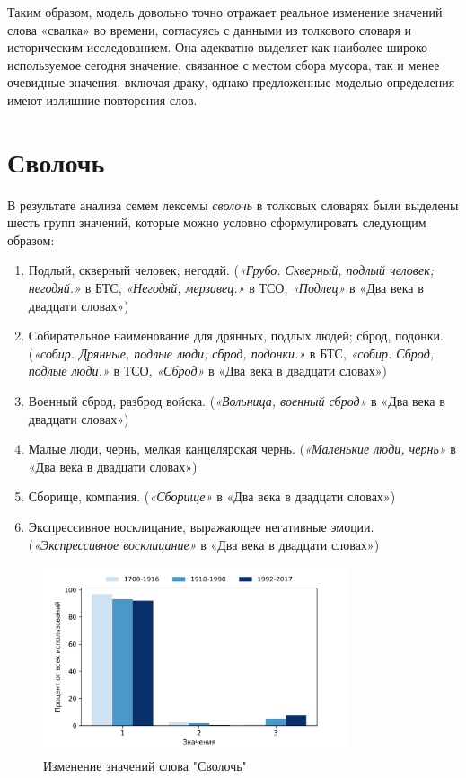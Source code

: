 Таким образом, модель довольно точно отражает реальное изменение значений слова «свалка»
во времени, согласуясь с данными из толкового словаря и историческим исследованием.
Она адекватно выделяет как наиболее широко используемое сегодня значение,
связанное с местом сбора мусора,
так и менее очевидные значения, включая драку,
однако предложенные моделью определения имеют излишние повторения слов.

\section*{Сволочь}

В результате анализа семем лексемы \textit{сволочь} в толковых словарях были выделены шесть групп значений,
которые можно условно сформулировать следующим образом:

\begin{enumerate}
    \item Подлый, скверный человек; негодяй.
(\textit{«Грубо. Скверный, подлый человек; негодяй.»} в БТС,
\textit{«Негодяй, мерзавец.»} в ТСО,
\textit{«Подлец»} в «Два века в двадцати словах»)
    \item Собирательное наименование для дрянных, подлых людей; сброд, подонки.
(\textit{«собир. Дрянные, подлые люди; сброд, подонки.»} в БТС,
\textit{«собир. Сброд, подлые люди.»} в ТСО,
\textit{«Сброд»} в «Два века в двадцати словах»)
    \item Военный сброд, разброд войска.
(\textit{«Вольница, военный сброд»} в «Два века в двадцати словах»)
    \item Малые люди, чернь, мелкая канцелярская чернь.
(\textit{«Маленькие люди, чернь»} в «Два века в двадцати словах»)
    \item Сборище, компания.
(\textit{«Сборище»} в «Два века в двадцати словах»)
    \item Экспрессивное восклицание, выражающее негативные эмоции.
(\textit{«Экспрессивное восклицание»} в «Два века в двадцати словах»)
\end{enumerate}

\begin{figure}[H]
	\centering
	\includegraphics[width=0.8\textwidth]{img/visualizations/svoloch'_minimal}
	\caption{Изменение значений слова "Сволочь"}
	\label{fig:Сволочь}
\end{figure}

